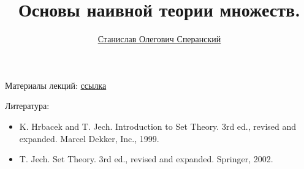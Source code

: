 \documentclass[12pt,a4paper]{article}
\title{Основы наивной теории множеств.}
\author{\href{https://users.math-cs.spbu.ru/~speranski}{Станислав Олегович Сперанский}}
\date{}
\begin{document}
    \maketitle

    Материалы лекций: \href{https://users.math-cs.spbu.ru/~speranski/courses/sets-2020-autumn/materials.html}{ссылка}
    
    Литература:
    \begin{itemize}
        \item K. Hrbacek and T. Jech. Introduction to Set Theory. 3rd ed., revised and expanded. Marcel Dekker, Inc., 1999.
        \item T. Jech. Set Theory. 3rd ed., revised and expanded. Springer, 2002.
    \end{itemize}

    
\end{document}
